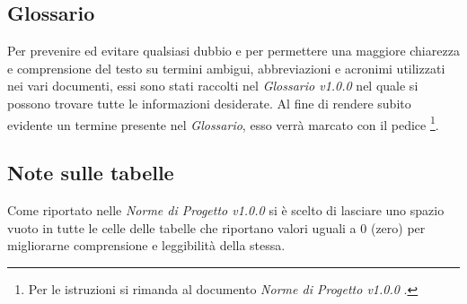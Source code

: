 \subsection{Glossario}
Per prevenire ed evitare qualsiasi dubbio e per permettere una maggiore chiarezza e comprensione del testo su termini ambigui, abbreviazioni e acronimi utilizzati nei vari documenti, essi sono stati raccolti nel \textit{Glossario v1.0.0} nel quale si possono trovare tutte le informazioni desiderate.
Al fine di rendere subito evidente un termine presente nel \textit{Glossario}, esso verrà marcato con il pedice \G\footnote{Per le istruzioni si rimanda al documento \textit{Norme di Progetto v1.0.0} .}.

\subsection{Note sulle tabelle}
Come riportato nelle \textit{Norme di Progetto v1.0.0} si è scelto di lasciare uno spazio vuoto in tutte le celle delle tabelle che riportano valori uguali a 0 (zero) per migliorarne comprensione e leggibilità della stessa.

